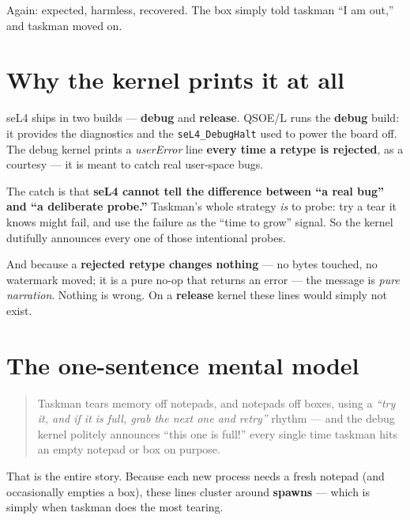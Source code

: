 Again: expected, harmless, recovered. The box simply told taskman ``I
am out,'' and taskman moved on.

\section{Why the kernel prints it at all}

seL4 ships in two builds --- \textbf{debug} and \textbf{release}.
QSOE/L runs the \textbf{debug} build: it provides the diagnostics and
the \texttt{seL4\_DebugHalt} used to power the board off. The debug
kernel prints a \emph{userError} line \textbf{every time a retype is
rejected}, as a courtesy --- it is meant to catch real user-space
bugs.

The catch is that \textbf{seL4 cannot tell the difference between ``a
real bug'' and ``a deliberate probe.''} Taskman's whole strategy
\emph{is} to probe: try a tear it knows might fail, and use the failure
as the ``time to grow'' signal. So the kernel dutifully announces every
one of those intentional probes.

And because a \textbf{rejected retype changes nothing} --- no bytes
touched, no watermark moved; it is a pure no-op that returns an error
--- the message is \emph{pure narration}. Nothing is wrong. On a
\textbf{release} kernel these lines would simply not exist.

\section{The one-sentence mental model}

\begin{quote}
Taskman tears memory off notepads, and notepads off boxes, using a
\emph{``try it, and if it is full, grab the next one and retry''}
rhythm --- and the debug kernel politely announces ``this one is
full!'' every single time taskman hits an empty notepad or box on
purpose.
\end{quote}

That is the entire story. Because each new process needs a fresh
notepad (and occasionally empties a box), these lines cluster around
\textbf{spawns} --- which is simply when taskman does the most tearing.
